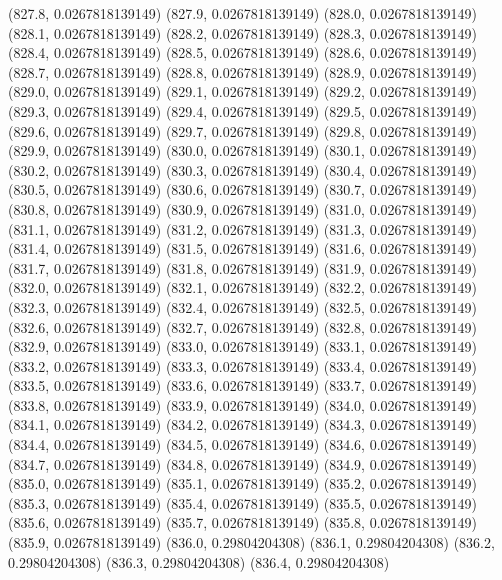 {					(827.8, 0.0267818139149)
					(827.9, 0.0267818139149)
					(828.0, 0.0267818139149)
					(828.1, 0.0267818139149)
					(828.2, 0.0267818139149)
					(828.3, 0.0267818139149)
					(828.4, 0.0267818139149)
					(828.5, 0.0267818139149)
					(828.6, 0.0267818139149)
					(828.7, 0.0267818139149)
					(828.8, 0.0267818139149)
					(828.9, 0.0267818139149)
					(829.0, 0.0267818139149)
					(829.1, 0.0267818139149)
					(829.2, 0.0267818139149)
					(829.3, 0.0267818139149)
					(829.4, 0.0267818139149)
					(829.5, 0.0267818139149)
					(829.6, 0.0267818139149)
					(829.7, 0.0267818139149)
					(829.8, 0.0267818139149)
					(829.9, 0.0267818139149)
					(830.0, 0.0267818139149)
					(830.1, 0.0267818139149)
					(830.2, 0.0267818139149)
					(830.3, 0.0267818139149)
					(830.4, 0.0267818139149)
					(830.5, 0.0267818139149)
					(830.6, 0.0267818139149)
					(830.7, 0.0267818139149)
					(830.8, 0.0267818139149)
					(830.9, 0.0267818139149)
					(831.0, 0.0267818139149)
					(831.1, 0.0267818139149)
					(831.2, 0.0267818139149)
					(831.3, 0.0267818139149)
					(831.4, 0.0267818139149)
					(831.5, 0.0267818139149)
					(831.6, 0.0267818139149)
					(831.7, 0.0267818139149)
					(831.8, 0.0267818139149)
					(831.9, 0.0267818139149)
					(832.0, 0.0267818139149)
					(832.1, 0.0267818139149)
					(832.2, 0.0267818139149)
					(832.3, 0.0267818139149)
					(832.4, 0.0267818139149)
					(832.5, 0.0267818139149)
					(832.6, 0.0267818139149)
					(832.7, 0.0267818139149)
					(832.8, 0.0267818139149)
					(832.9, 0.0267818139149)
					(833.0, 0.0267818139149)
					(833.1, 0.0267818139149)
					(833.2, 0.0267818139149)
					(833.3, 0.0267818139149)
					(833.4, 0.0267818139149)
					(833.5, 0.0267818139149)
					(833.6, 0.0267818139149)
					(833.7, 0.0267818139149)
					(833.8, 0.0267818139149)
					(833.9, 0.0267818139149)
					(834.0, 0.0267818139149)
					(834.1, 0.0267818139149)
					(834.2, 0.0267818139149)
					(834.3, 0.0267818139149)
					(834.4, 0.0267818139149)
					(834.5, 0.0267818139149)
					(834.6, 0.0267818139149)
					(834.7, 0.0267818139149)
					(834.8, 0.0267818139149)
					(834.9, 0.0267818139149)
					(835.0, 0.0267818139149)
					(835.1, 0.0267818139149)
					(835.2, 0.0267818139149)
					(835.3, 0.0267818139149)
					(835.4, 0.0267818139149)
					(835.5, 0.0267818139149)
					(835.6, 0.0267818139149)
					(835.7, 0.0267818139149)
					(835.8, 0.0267818139149)
					(835.9, 0.0267818139149)
					(836.0, 0.29804204308)
					(836.1, 0.29804204308)
					(836.2, 0.29804204308)
					(836.3, 0.29804204308)
					(836.4, 0.29804204308)
}
